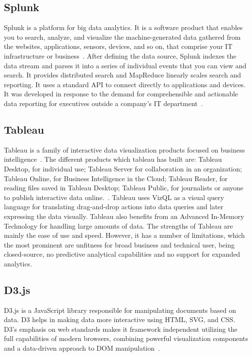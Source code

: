 \subsection{Splunk}

Splunk is a platform for big data analytics. It is a software product
that enables you to search, analyze, and visualize the
machine-generated data gathered from the websites, applications,
sensors, devices, and so on, that comprise your IT infrastructure or
business~\cite{www-splunk}. After defining the data source, Splunk
indexes the data stream and parses it into a series of individual
events that you can view and search. It provides distributed search
and MapReduce linearly scales search and reporting. It uses a standard
API to connect directly to applications and devices. It was developed
in response to the demand for comprehensible and actionable data
reporting for executives outside a company's IT
department~\cite{www-splunk}.
	  
\subsection{Tableau}

Tableau is a family of interactive data visualization products focused
on business intelligence~\cite{www-tableau-tutorial}. The different
products which tableau has built are: Tableau Desktop, for individual
use; Tableau Server for collaboration in an organization; Tableau
Online, for Business Intelligence in the Cloud; Tableau Reader, for
reading files saved in Tableau Desktop; Tableau Public, for
journalists or anyone to publish interactive data
online.~\cite{www-tableau-web}. Tableau uses VizQL as a visual query
language for translating drag-and-drop actions into data queries and
later expressing the data visually. Tableau also benefits from an
Advanced In-Memory Technology for handling large amounts of data.  The
strengths of Tableau are mainly the ease of use and speed.  However,
it has a number of limitations, which the most prominent are unfitness
for broad business and technical user, being closed-source, no
predictive analytical capabilities and no support for expanded
analytics.

\pv

\subsection{D3.js}

D3.js is a JavaScript library responsible for manipulating documents
based on data. D3 helps in making data more interactive using HTML,
SVG, and CSS. D3’s emphasis on web standards makes it framework
independent utilizing the full capabilities of modern browsers,
combining powerful visualization components and a data-driven approach
to DOM manipulation~\cite{www-d3}.

